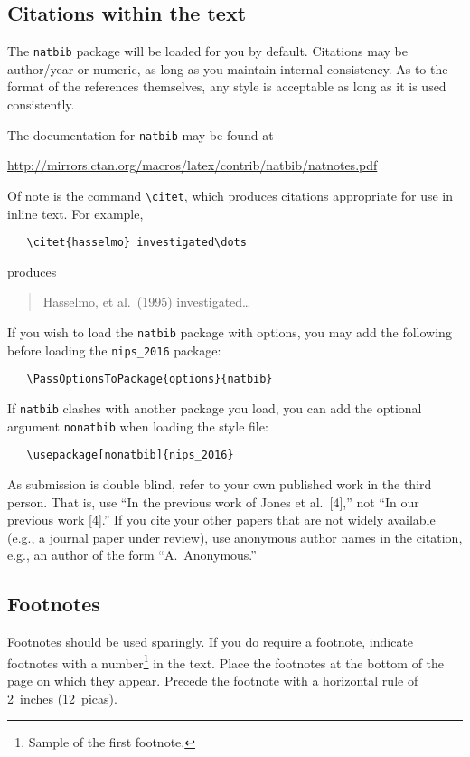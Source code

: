 \documentclass{article}
\begin{document}
\subsection{Citations within the text}

The \verb+natbib+ package will be loaded for you by default.
Citations may be author/year or numeric, as long as you maintain
internal consistency.  As to the format of the references themselves,
any style is acceptable as long as it is used consistently.

The documentation for \verb+natbib+ may be found at
\begin{center}
  \url{http://mirrors.ctan.org/macros/latex/contrib/natbib/natnotes.pdf}
\end{center}
Of note is the command \verb+\citet+, which produces citations
appropriate for use in inline text.  For example,
\begin{verbatim}
   \citet{hasselmo} investigated\dots
\end{verbatim}
produces
\begin{quote}
  Hasselmo, et al.\ (1995) investigated\dots
\end{quote}

If you wish to load the \verb+natbib+ package with options, you may
add the following before loading the \verb+nips_2016+ package:
\begin{verbatim}
   \PassOptionsToPackage{options}{natbib}
\end{verbatim}

If \verb+natbib+ clashes with another package you load, you can add
the optional argument \verb+nonatbib+ when loading the style file:
\begin{verbatim}
   \usepackage[nonatbib]{nips_2016}
\end{verbatim}

As submission is double blind, refer to your own published work in the
third person. That is, use ``In the previous work of Jones et
al.\ [4],'' not ``In our previous work [4].'' If you cite your other
papers that are not widely available (e.g., a journal paper under
review), use anonymous author names in the citation, e.g., an author
of the form ``A.\ Anonymous.''

\subsection{Footnotes}

Footnotes should be used sparingly.  If you do require a footnote,
indicate footnotes with a number\footnote{Sample of the first
  footnote.} in the text. Place the footnotes at the bottom of the
page on which they appear.  Precede the footnote with a horizontal
rule of 2~inches (12~picas).
\end{document}
